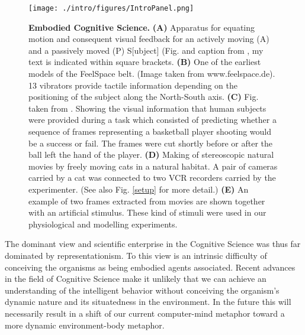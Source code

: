 \begin{figure}[htp]
\centerline{\texttt{[image: ./intro/figures/IntroPanel.png]}}
\caption[Embodied Cognitive Science]{ \textbf{Embodied Cognitive Science.}
\textbf{(A)} Apparatus for equating motion and consequent visual feedback
for an actively moving (A) and a passively moved (P) S[ubject] (Fig. and
caption from \cite{held1963a}, my text is indicated within square brackets.
\textbf{(B)} One of the earliest models of the
FeelSpace\textsuperscript{\textregistered} belt. (Image taken from
www.feelspace.de). 13 vibrators provide tactile information depending on
the positioning of the subject along the North-South axis. \textbf{(C)}
Fig. taken from \cite{aglioti2008a}. Showing the visual information that
human subjects were provided during a task which consisted of predicting
whether a sequence of frames representing a basketball player shooting
would be a success or fail. The frames were cut shortly before or after the
ball left the hand of the player. \textbf{(D)} Making of stereoscopic
natural movies by freely moving cats in a natural habitat. A pair of
cameras carried by a cat was connected to two VCR recorders carried by the
experimenter. (See also Fig. \ref{setup} for more detail.) \textbf{(E)} An
example of two frames extracted from movies are shown together with an
artificial stimulus. These kind of stimuli were used in our physiological
and modelling experiments. } \label{basket} \end{figure}

The dominant view and scientific enterprise in the Cognitive Science was
thus far dominated by representationism. To this view is an intrinsic
difficulty of conceiving the organisms as being embodied agents associated.
Recent advances in the field of Cognitive Science make it unlikely that we
can achieve an understanding of the intelligent behavior without conceiving
the organism's dynamic nature and its situatedness in the environment. In
the future this will necessarily result in a shift of our current
computer-mind metaphor toward a more dynamic environment-body metaphor. 

